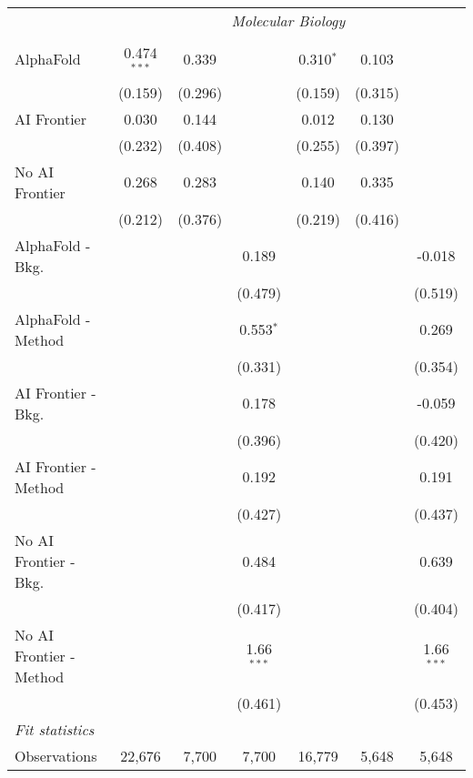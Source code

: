 \begin{tabular}{lcccccc}
 & \multicolumn{6}{c}{\textit{Molecular Biology}} \\ \\
   AlphaFold               & 0.474$^{***}$ & 0.339   &              & 0.310$^{*}$ & 0.103   &   \\   
                           & (0.159)       & (0.296) &              & (0.159)     & (0.315) &   \\   
   AI Frontier             & 0.030         & 0.144   &              & 0.012       & 0.130   &   \\   
                           & (0.232)       & (0.408) &              & (0.255)     & (0.397) &   \\   
   No AI Frontier          & 0.268         & 0.283   &              & 0.140       & 0.335   &   \\   
                           & (0.212)       & (0.376) &              & (0.219)     & (0.416) &   \\   
   AlphaFold - Bkg.        &               &         & 0.189        &             &         & -0.018\\   
                           &               &         & (0.479)      &             &         & (0.519)\\   
   AlphaFold - Method      &               &         & 0.553$^{*}$  &             &         & 0.269\\   
                           &               &         & (0.331)      &             &         & (0.354)\\   
   AI Frontier - Bkg.      &               &         & 0.178        &             &         & -0.059\\   
                           &               &         & (0.396)      &             &         & (0.420)\\   
   AI Frontier - Method    &               &         & 0.192        &             &         & 0.191\\   
                           &               &         & (0.427)      &             &         & (0.437)\\   
   No AI Frontier - Bkg.   &               &         & 0.484        &             &         & 0.639\\   
                           &               &         & (0.417)      &             &         & (0.404)\\   
   No AI Frontier - Method &               &         & 1.66$^{***}$ &             &         & 1.66$^{***}$\\   
                           &               &         & (0.461)      &             &         & (0.453)\\   
   \midrule
   \emph{Fit statistics}\\
   Observations            & 22,676        & 7,700   & 7,700        & 16,779      & 5,648   & 5,648\\  
   

\end{tabular}
